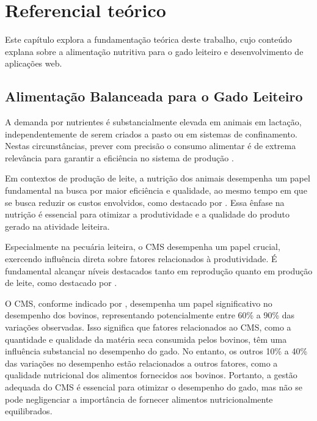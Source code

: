 \chapter{Referencial te\'orico}\label{cap:referencialTeorico}

Este capítulo explora a fundamentação teórica deste trabalho, cujo conteúdo explana sobre a alimentação nutritiva para o gado leiteiro e desenvolvimento de aplicações web.

\section{Alimentação Balanceada para o Gado Leiteiro}\label{sec:alimentacaoBalanceadaGadoLeiteiro}

A demanda por nutrientes é substancialmente elevada em animais em lactação, independentemente de serem criados a pasto ou em sistemas de confinamento. Nestas circunstâncias, prever com precisão o consumo alimentar é de extrema relevância para garantir a eficiência no sistema de produção \cite{Kolln:2014:AvaliacaoSistemaOtimizacaoRacaoVacaLeiteira}.

Em contextos de produção de leite, a nutrição dos animais desempenha um papel fundamental na busca por maior eficiência e qualidade, ao mesmo tempo em que se busca reduzir os custos envolvidos, como destacado por . Essa ênfase na nutrição é essencial para otimizar a produtividade e a qualidade do produto gerado na atividade leiteira.

Especialmente na pecuária leiteira, o \gls{CMS} desempenha um papel crucial, exercendo influência direta sobre fatores relacionados à produtividade. É fundamental alcançar níveis destacados tanto em reprodução quanto em produção de leite, como destacado por .

O \gls{CMS}, conforme indicado por , desempenha um papel significativo no desempenho dos bovinos, representando potencialmente entre 60\% a 90\% das variações observadas. Isso significa que fatores relacionados ao \gls{CMS}, como a quantidade e qualidade da matéria seca consumida pelos bovinos, têm uma influência substancial no desempenho do gado. No entanto, os outros 10\% a 40\% das variações no desempenho estão relacionados a outros fatores, como a qualidade nutricional dos alimentos fornecidos aos bovinos. Portanto, a gestão adequada do \gls{CMS} é essencial para otimizar o desempenho do gado, mas não se pode negligenciar a importância de fornecer alimentos nutricionalmente equilibrados.

